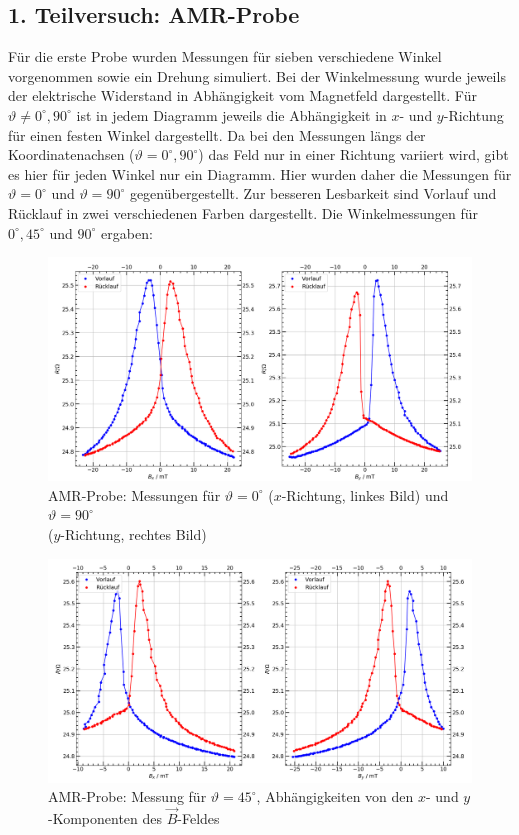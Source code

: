 \documentclass[german,  %
parskip=full,  %
]{scrartcl}
\begin{document}
\subsection{1. Teilversuch: AMR-Probe}
Für die erste Probe wurden Messungen für sieben verschiedene Winkel vorgenommen sowie ein Drehung simuliert. Bei der Winkelmessung wurde jeweils der elektrische Widerstand in Abhängigkeit vom Magnetfeld dargestellt. Für \(\vartheta\neq 0^{\circ},90^{\circ}\) ist in jedem Diagramm jeweils die Abhängigkeit in \(x\)- und \(y\)-Richtung für einen festen Winkel dargestellt. Da bei den Messungen längs der Koordinatenachsen (\(\vartheta = 0^{\circ},90^{\circ}\)) das Feld nur in einer Richtung variiert wird, gibt es hier für jeden Winkel nur ein Diagramm. Hier wurden daher die Messungen für  \(\vartheta = 0^{\circ}\) und \(\vartheta = 90^{\circ}\) gegenübergestellt. Zur besseren Lesbarkeit sind Vorlauf und Rücklauf in zwei verschiedenen Farben dargestellt. Die Winkelmessungen für \(0^{\circ},45^{\circ}\) und \(90^{\circ}\) ergaben:
\newpage
\begin{figure}[h!]\centering
\includegraphics[width=\textwidth]{Probe1_0_und_90_Grad.png}
\caption{AMR-Probe: Messungen für \(\vartheta=0^{\circ}\) (\(x\)-Richtung, linkes Bild) und \(\vartheta=90^{\circ}\) \\ (\(y\)-Richtung, rechtes Bild)}
\end{figure} 
\begin{figure}[h!]\centering
\includegraphics[width=\textwidth]{Probe1_45_Grad.png}
\caption{AMR-Probe: Messung für \(\vartheta=45^{\circ}\), Abhängigkeiten von den \(x\)- und \(y\)-Komponenten des \(\vec{B}\)-Feldes}
\end{figure} 
\end{document}
